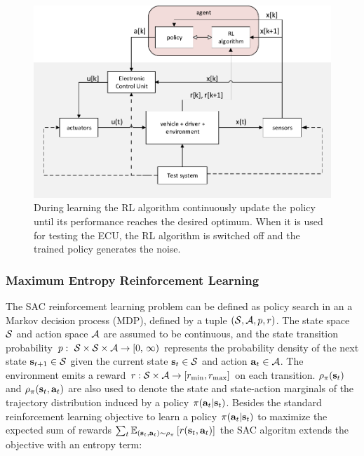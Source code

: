 \documentclass[a4paper, fleqn]{template/cas-dc}
\begin{document}
	\begin{figure}[h]
		\begin{center}
			\includegraphics[scale=0.5]{figures/system4.pdf}
			\caption{During learning the RL algorithm continuously update the policy until its performance reaches the desired optimum. When it is used for testing the ECU, the RL algorithm is switched off and the trained policy generates the noise.}
			\label{fig:RL}			
		\end{center}
	\end{figure}
	
	\subsubsection{Maximum Entropy Reinforcement Learning}
	The SAC reinforcement learning problem can be defined as policy search in an a Markov decision process (MDP), defined by a tuple $(\mathcal{S}, \mathcal{A}, p, r)$. The state space $\mathcal{S}$ and action space $\mathcal{A}$ are assumed to be continuous, and the state transition probability $\pdyn:\ \sspace \times \sspace \times \aspace \rightarrow [0,\, \infty)$ represents the probability density of the next state ${\mathbf{s}_{t+1}}\in\mathcal{S}$ given the current state ${\mathbf{s}_t}\in\mathcal{S}$ and action ${\mathbf{a}_t}\in\mathcal{A}$. The environment emits a reward $r: \mathcal{S} \times \mathcal{A} \rightarrow  [r_\mathrm{min},r_\mathrm{max}]$ on each transition. $\rho_\pi({\mathbf{s}_t})$ and $\rho_\pi({\mathbf{s}_t},{\mathbf{a}_t})$ are also used to denote the state and state-action marginals of the trajectory distribution induced by a policy $\pi({\mathbf{a}_t}|{\mathbf{s}_t})$.  Besides the standard reinforcement learning objective to learn a policy $\pi({\mathbf{a}_t}|{\mathbf{s}_t})$ to maximize the expected sum of rewards $\sum_t \operatorname{\mathbb{E}}_{({\mathbf{s}_t},{\mathbf{a}_t})\sim\rho_\pi}\left[r({\mathbf{s}_t},{\mathbf{a}_t})\right]$ the SAC algoritm extends the objective with an entropy term:
	
\end{document}
